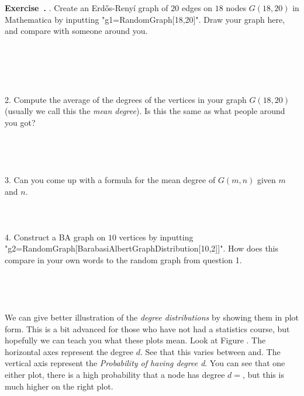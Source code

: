 \documentclass[12pt]{article}
\newcounter{exercise}[section]
\newenvironment{exercise}[1][]{\refstepcounter{exercise}\par\medskip
	\noindent \textbf{Exercise~\thesection.\theexercise #1} \rmfamily}{\medskip}
\begin{document}
\begin{exercise}
1. Create an Erdős-Renyí graph of $20$ edges on $18$ nodes $G(18,20)$ in Mathematica by inputting "g1=RandomGraph[{18,20}]". Draw your graph here, and compare with someone around you.
\\
\\
\\
\\
\\
\\
2. Compute the average of the degrees of the vertices in your graph $G(18,20)$ (usually we call this the \emph{mean degree}). Is this the same as what people around you got?
\\
\\
\\
\\
\\
3. Can you come up with a formula for the mean degree of $G(m,n)$ given $m$ and $n$.
\\
\\
\\
\\
4. Construct a BA graph on $10$ vertices by inputting  "g2=RandomGraph[BarabasiAlbertGraphDistribution[10,2]]". How does this compare in your own words to the random graph from question 1.
\\
\\
\\
\\
\\
\end{exercise}
We can give better illustration of the \emph{degree distributions} by showing them in plot form. This is a bit advanced for those who have not had a statistics course, but hopefully we can teach you what these plots mean. Look at Figure .  The horizontal axes represent the degree $d$. See that this varies between and. The vertical axis represent the \emph{Probability of having degree d}. You can see that one either plot, there is a high probability that a node has degree $d=$, but this is much higher on the right plot.
\end{document}
